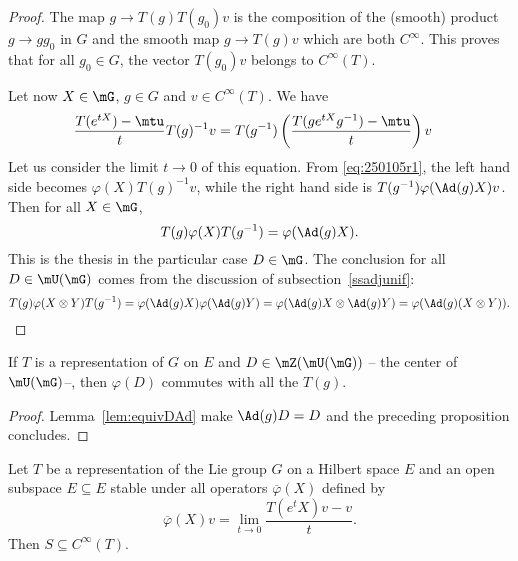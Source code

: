 \begin{proof}
	The map $g\to T(g)T(g_0)v$ is the composition of the (smooth) product $g\to gg_0$ in $G$ and the smooth map $g\to T(g)v$ which are both $ C^{\infty}$. This proves that for all $g_0\in G$, the vector $T(g_0)v$ belongs to $C^{\infty}(T)$.

	Let now $X\in\mG$, $g\in G$ and $v\in C^{\infty}(T)$. We have
	\begin{equation}
		\begin{split}
			\frac{T(e^{tX})-\mtu}{t}T(g)^{-1}v&=T(g^{-1})\left( \frac{T(ge^{tX}g^{-1})-\mtu}{t} \right)v
		\end{split}
	\end{equation}
	Let us consider the limit $t\to 0$ of this equation. From \eqref{eq:250105r1}, the left hand side becomes $\varphi(X)T(g)^{-1}v$, while the right hand side is $T(g^{-1})\varphi(\Ad(g)X)v$. Then for all $X\in\mG$,
	\begin{equation}
		T(g)\varphi(X)T(g^{-1})=\varphi(\Ad(g)X).
	\end{equation}
	This is the thesis in the particular case $D\in\mG$. The conclusion for all $D\in\mU(\mG)$ comes from the discussion of subsection~\ref{ssadjunif}:
	\begin{equation}
		T(g)\varphi(X\otimes Y)T(g^{-1})=\varphi(\Ad(g)X)\varphi(\Ad(g)Y)
		=\varphi(\Ad(g)X\otimes\Ad(g)Y)
		=\varphi(\Ad(g)(X\otimes Y)).
	\end{equation}
\end{proof}

\begin{corollary}
	If $T$ is a representation of $G$ on $E$ and $D\in\mZ(\mU(\mG))$ -- the center of $\mU(\mG)$--, then $\varphi(D)$ commutes with all the $T(g)$.
\end{corollary}

\begin{proof}
	Lemma~\ref{lem:equivDAd} make $\Ad(g)D=D$ and the preceding proposition concludes.
\end{proof}

\begin{proposition}
	Let $T$ be a representation of the Lie group $G$ on a Hilbert space $E$ and an open subspace $E\subseteq E$ stable under all operators $\overline{ \varphi }(X)$ defined by
	\begin{equation} \label{eq:ovlphilim}
		\overline{ \varphi }(X)v=\lim_{t\to 0}\frac{ T(e^tX)v-v }{ t }.
	\end{equation}
	Then $S\subseteq  C^{\infty}(T)$.
\end{proposition}

